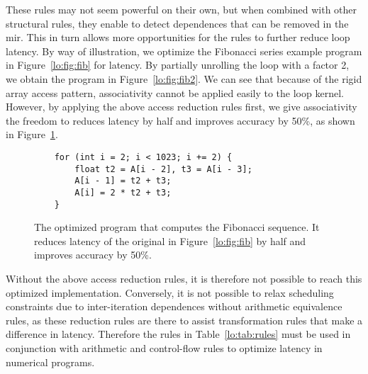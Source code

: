These rules may not seem powerful on their own, but when combined with other
structural rules, they enable \soap{} to detect dependences that can be removed
in the \gls{mir}\@.  This in turn allows more opportunities for the rules
to further reduce loop latency.  By way of illustration, we optimize the
Fibonacci series example program in Figure~\ref{lo:fig:fib} for latency.
By partially unrolling the loop with a factor 2, we obtain the program in
Figure~\ref{lo:fig:fib2}.  We can see that because of the rigid array access
pattern, associativity cannot be applied easily to the loop kernel.  However,
by applying the above access reduction rules first, we give associativity the
freedom to reduces latency by half and improves accuracy by 50\%, as shown in
Figure~\ref{lo:lst:fib_opt}.

\begin{figure}[ht]
    \centering
    \begin{lstlisting}
    for (int i = 2; i < 1023; i += 2) {
        float t2 = A[i - 2], t3 = A[i - 3];
        A[i - 1] = t2 + t3;
        A[i] = 2 * t2 + t3;
    }
    \end{lstlisting}
    \caption{%
        The optimized program that computes the Fibonacci sequence.  It reduces
        latency of the original in Figure~\ref{lo:fig:fib} by half and improves
        accuracy by 50\%.
    }\label{lo:lst:fib_opt}
\end{figure}

Without the above access reduction rules, it is therefore not possible to
reach this optimized implementation.  Conversely, it is not possible to
relax scheduling constraints due to inter-iteration dependences without
arithmetic equivalence rules, as these reduction rules are there to assist
transformation rules that make a difference in latency.  Therefore the rules
in Table~\ref{lo:tab:rules} must be used in conjunction with arithmetic and
control-flow rules to optimize latency in numerical programs.
